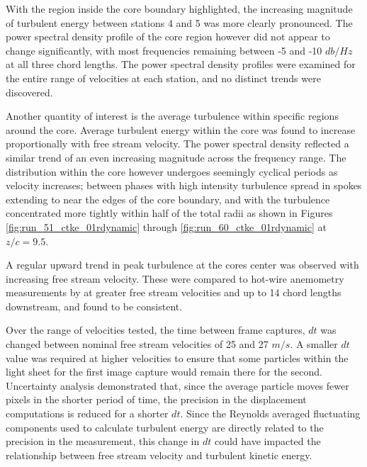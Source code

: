 



With the region inside the core boundary highlighted, the increasing magnitude 
of turbulent energy between stations 4 and 5 was more clearly pronounced. The 
power spectral density profile of the core region however did not appear to 
change significantly, with most frequencies remaining between -5 and -10 
$db/Hz$ at all three chord lengths. The power spectral density profiles were 
examined for the entire range of velocities at each station, and no distinct 
trends were discovered. 





Another quantity of interest is the average turbulence within specific regions 
around the core. Average turbulent energy within the core was found to increase 
proportionally with free stream velocity. The power spectral density reflected 
a similar trend of an even increasing magnitude across the frequency range. The 
distribution within the core however undergoes seemingly cyclical periods as 
velocity increases; between phases with high intensity turbulence spread in 
spokes extending to near the edges of the core boundary, and with the 
turbulence concentrated more tightly within half of the total radii as shown in 
Figures \ref{fig:run_51_ctke_01rdynamic} through 
\ref{fig:run_60_ctke_01rdynamic} at $z/c = 9.5$.












A regular upward trend in peak turbulence at the cores center was observed with 
increasing free stream velocity. These were compared to hot-wire anemometry 
measurements by \cite{thompson2016} at greater free stream velocities and up to 
14 chord lengths downstream, and found to be consistent.

Over the range of velocities tested, the time between frame captures, $dt$ was 
changed between nominal free stream velocities of 25 and 27 $m/s$. A smaller 
$dt$ value was required at higher velocities to ensure that some particles 
within the light sheet for the first image capture would remain there for the 
second. Uncertainty analysis demonstrated that, since the average particle 
moves fewer pixels in the shorter period of time, the precision in the 
displacement computations is reduced for a shorter $dt$. Since the Reynolds 
averaged fluctuating components used to calculate turbulent energy are directly 
related to the precision in the measurement, this change in $dt$ could have 
impacted the relationship between free stream velocity and turbulent kinetic 
energy.

